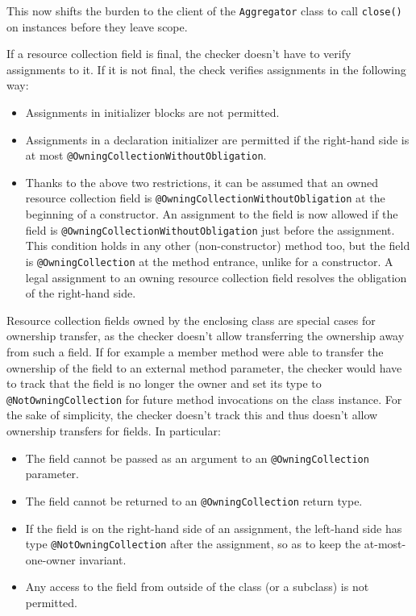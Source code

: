 This now shifts the burden to the client of the \texttt{Aggregator} class to call \texttt{close()} on instances before they leave scope.

If a resource collection field is final, the checker doesn't have to verify assignments to it. If it is not final, the check verifies assignments in the following way:
\begin{itemize}
  \item Assignments in initializer blocks are not permitted.
  \item Assignments in a declaration initializer are permitted if the right-hand side is at most \texttt{@OwningCollectionWithoutObligation}.
  \item Thanks to the above two restrictions, it can be assumed that an owned resource collection field is \texttt{@OwningCollectionWithoutObligation} at the beginning of a constructor. An assignment to the field is now allowed if the field is \texttt{@OwningCollectionWithoutObligation} just before the assignment. This condition holds in any other (non-constructor) method too, but the field is \texttt{@OwningCollection} at the method entrance, unlike for a constructor. A legal assignment to an owning resource collection field resolves the obligation of the right-hand side.
\end{itemize}

Resource collection fields owned by the enclosing class are special cases for ownership transfer, as the checker doesn't allow transferring the ownership away from such a field. If for example a member method were able to transfer the ownership of the field to an external method parameter, the checker would have to track that the field is no longer the owner and set its type to \texttt{@NotOwningCollection} for future method invocations on the class instance. For the sake of simplicity, the checker doesn't track this and thus doesn't allow ownership transfers for fields. In particular:

\begin{itemize}
  \item The field cannot be passed as an argument to an \texttt{@OwningCollection} parameter.
  \item The field cannot be returned to an \texttt{@OwningCollection} return type.
  \item If the field is on the right-hand side of an assignment, the left-hand side has type \texttt{@NotOwningCollection} after the assignment, so as to keep the at-most-one-owner invariant.
  \item Any access to the field from outside of the class (or a subclass) is not permitted.
\end{itemize}

